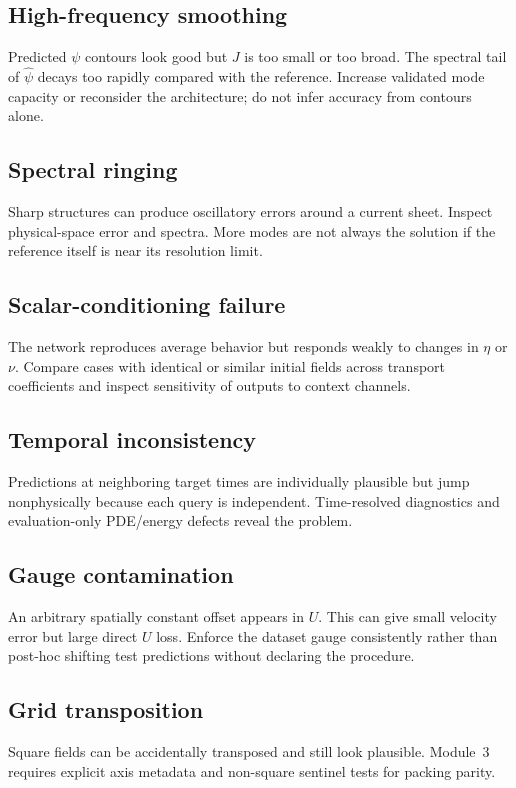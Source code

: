 \documentclass[11pt]{article}
\begin{document}
\subsection{High-frequency smoothing}
Predicted $\psi$ contours look good but $J$ is too small or too broad. The spectral tail of $\widehat\psi$ decays too rapidly compared with the reference. Increase validated mode capacity or reconsider the architecture; do not infer accuracy from contours alone.

\subsection{Spectral ringing}
Sharp structures can produce oscillatory errors around a current sheet. Inspect physical-space error and spectra. More modes are not always the solution if the reference itself is near its resolution limit.

\subsection{Scalar-conditioning failure}
The network reproduces average behavior but responds weakly to changes in $\eta$ or $\nu$. Compare cases with identical or similar initial fields across transport coefficients and inspect sensitivity of outputs to context channels.

\subsection{Temporal inconsistency}
Predictions at neighboring target times are individually plausible but jump nonphysically because each query is independent. Time-resolved diagnostics and evaluation-only PDE/energy defects reveal the problem.

\subsection{Gauge contamination}
An arbitrary spatially constant offset appears in $U$. This can give small velocity error but large direct $U$ loss. Enforce the dataset gauge consistently rather than post-hoc shifting test predictions without declaring the procedure.

\subsection{Grid transposition}
Square fields can be accidentally transposed and still look plausible. Module~3 requires explicit axis metadata and non-square sentinel tests for packing parity.
\end{document}
